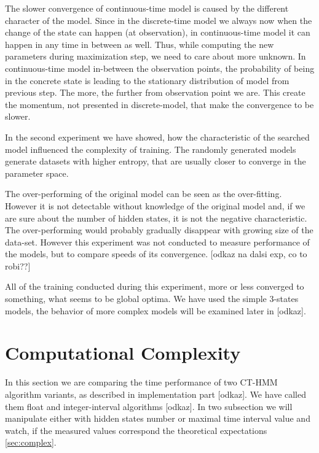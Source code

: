 \documentclass[thesis=M,english]{FITthesis}[2012/10/20]
\begin{document}
\begin{itemize}
The slower convergence of continuous-time model is caused by the different character of the model. Since in the discrete-time model we always now when the change of the state can happen (at observation), in continuous-time model it can happen in any time in between as well. Thus, while computing the new parameters during maximization step, we need to care about more unknown. In continuous-time model in-between the observation points, the probability of being in the concrete state is leading to the stationary distribution of model from previous step. The more, the further from observation point we are. This create the momentum, not presented in discrete-model, that make the convergence to be slower.

In the second experiment we have showed, how the characteristic of the searched model influenced the complexity of training. The randomly generated models generate datasets with higher entropy, that are usually closer to converge in the parameter space. 

The over-performing of the original model can be seen as the over-fitting. However it is not detectable without knowledge of the original model and, if we are sure about the number of hidden states, it is not the negative characteristic. The over-performing would probably gradually disappear with growing size of the data-set. However this experiment was not conducted to measure performance of the models, but to compare speeds of its convergence. [odkaz na dalsi exp, co to robi??]

All of the training conducted during this experiment, more or less converged to something, what seems to be global optima. We have used the simple 3-states models, the behavior of more complex models will be examined later in [odkaz].    
 	
\end{itemize}

\section{Computational Complexity}\label{sec:cc}

In this section we are comparing the time performance of two CT-HMM algorithm variants, as described in implementation part [odkaz]. We have called them float and integer-interval algorithms [odkaz].
In two subsection we will manipulate either with hidden states number or maximal time interval value and watch, if the measured values correspond the theoretical expectations \ref{sec:complex}.
\end{document}
